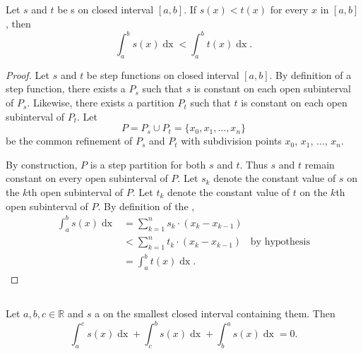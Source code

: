 \documentclass{report}
\begin{document}
\subsection{}%

  \begin{theorem}[1.5]
    Let $s$ and $t$ be s on closed interval
      $[a, b]$.
    If $s(x) < t(x)$ for every $x$ in $[a, b]$, then
      $$\int_a^b s(x) \mathop{dx} < \int_a^b t(x) \mathop{dx}.$$
  \end{theorem}

  \begin{proof}
    Let $s$ and $t$ be step functions on closed interval $[a, b]$.
    By definition of a step function, there exists a 
      $P_s$ such that $s$ is constant on each open subinterval of $P_s$.
    Likewise, there exists a partition $P_t$ such that $t$ is constant on each
      open subinterval of $P_t$.
    Let $$P = P_s \cup P_t = \{x_0, x_1, \ldots, x_n\}$$ be the common
      refinement of $P_s$ and $P_t$ with subdivision points $x_0$, $x_1$,
      $\ldots$, $x_n$.

    By construction, $P$ is a step partition for both $s$ and $t$.
    Thus $s$ and $t$ remain constant on every open subinterval of $P$.
    Let $s_k$ denote the constant value of $s$ on the $k$th open subinterval of
      $P$.
    Let $t_k$ denote the constant value of $t$ on the $k$th open subinterval of
      $P$.
    By definition of the ,
      \begin{align*}
        \int_a^b s(x) \mathop{dx}
          & = \sum_{k=1}^n s_k \cdot (x_k - x_{k-1}) \\
          & < \sum_{k=1}^n t_k \cdot (x_k - x_{k-1}) & \text{by hypothesis} \\
          & = \int_a^b t(x) \mathop{dx}.
      \end{align*}
  \end{proof}

\subsection{}%

  \begin{theorem}[1.6]
    Let $a, b, c \in \mathbb{R}$ and $s$ a  on the
      smallest closed interval containing them.
    Then
      $$\int_a^c s(x) \mathop{dx} + \int_c^b s(x) \mathop{dx} +
        \int_b^a s(x) \mathop{dx} = 0.$$
  \end{theorem}
\end{document}
